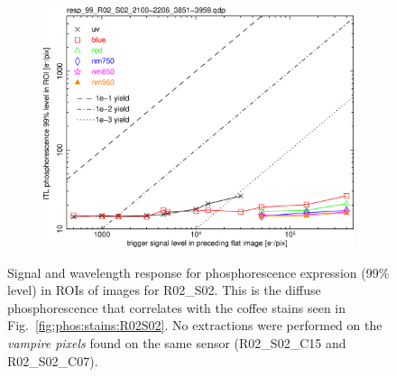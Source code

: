 \begin{figure}[!htbp]
\centering
\begin{subfigure}{0.45\textwidth}    
  \centering
  \includegraphics[width=\textwidth]{figures/phosphorescence-survey/phos_resp/resp_99_R02_S02_2100-2206_3851-3959.png}    
\end{subfigure}
\newline
\caption{Signal and wavelength response for phosphorescence expression (99\% level) in ROIs of images for R02\_S02. This is the diffuse phosphorescence that correlates with the coffee stains seen in Fig.~\ref{fig:phos:stains:R02S02}. No extractions were performed on the {\it vampire pixels} found on the same sensor (R02\_S02\_C15 and R02\_S02\_C07).}
\label{fig:phos:resp:R02S02}
\end{figure}

